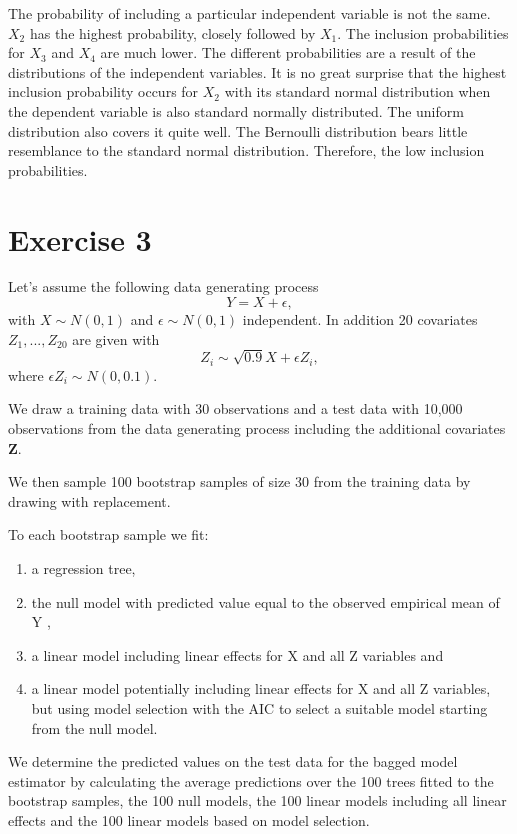 \documentclass[
]{article}
\begin{document}
The probability of including a particular independent variable is not
the same. \(X_2\) has the highest probability, closely followed by
\(X_1\). The inclusion probabilities for \(X_3\) and \(X_4\) are much
lower. The different probabilities are a result of the distributions of
the independent variables. It is no great surprise that the highest
inclusion probability occurs for \(X_2\) with its standard normal
distribution when the dependent variable is also standard normally
distributed. The uniform distribution also covers it quite well. The
Bernoulli distribution bears little resemblance to the standard normal
distribution. Therefore, the low inclusion probabilities.

\section{Exercise 3}\label{exercise-3}

Let's assume the following data generating process
\[ Y = X + \epsilon, \] with \(X \sim N(0,1)\) and
\(\epsilon \sim N(0,1)\) independent. In addition 20 covariates
\(Z_1, ... ,Z_{20}\) are given with
\[Z_i \sim \sqrt{0.9}X + \epsilon Z_i ,\] where
\(\epsilon Z_i \sim N(0, 0.1).\)

We draw a training data with 30 observations and a test data with 10,000
observations from the data generating process including the additional
covariates \textbf{Z}.

We then sample 100 bootstrap samples of size 30 from the training data
by drawing with replacement.

To each bootstrap sample we fit:

\begin{enumerate}
\item a regression tree,
\item the null model with predicted value equal to the observed empirical mean of Y ,
\item a linear model including linear effects for X and all Z variables and
\item a linear model potentially including linear effects for X and all Z variables, but using model selection
with the AIC to select a suitable model starting from the null model.
\end{enumerate}

We determine the predicted values on the test data for the bagged model
estimator by calculating the average predictions over the 100 trees
fitted to the bootstrap samples, the 100 null models, the 100 linear
models including all linear effects and the 100 linear models based on
model selection.
\end{document}
